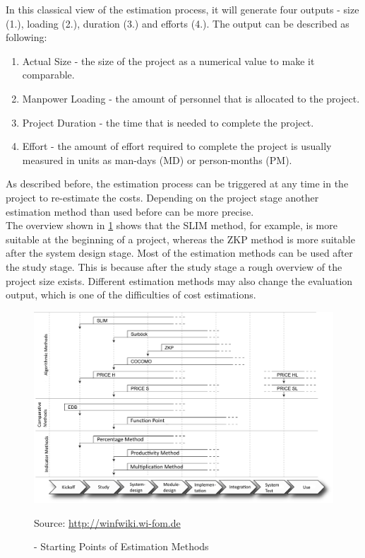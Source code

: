 In this classical view of the estimation process, it will generate four outputs - size (1.), loading (2.), duration (3.) and efforts (4.). The output can be described as following:
\begin{enumerate}
	\item Actual Size - the size of the project as a numerical value to make it comparable.
	\item Manpower Loading - the amount of personnel that is allocated to the project.
	\item Project Duration - the time that is needed to complete the project.
	\item Effort - the amount of effort required to complete the project is usually measured in units as man-days (MD) or person-months (PM).
\end{enumerate}
As described before, the estimation process can be triggered at any time in the project to re-estimate the costs. Depending on the project stage another estimation method than used before can be more precise.\\
The overview shown in \ref{fig:estimationMethodInStage} shows that the SLIM method, for example, is more suitable at the beginning of a project, whereas the ZKP method is more suitable after the system design stage. Most of the estimation methods can be used after the study stage. This is because after the study stage a rough overview of the project size exists. Different estimation methods may also change the evaluation output, which is one of the difficulties of cost estimations.\\
\begin{figure}[h] 
	\centering 
	\includegraphics[width=13cm]{images/Einsatzzeitpunkte2.PNG} 
	\caption{- Starting Points of Estimation Methods} 
	Source: \url{http://winfwiki.wi-fom.de}
	\label{fig:estimationMethodInStage}
\end{figure}

